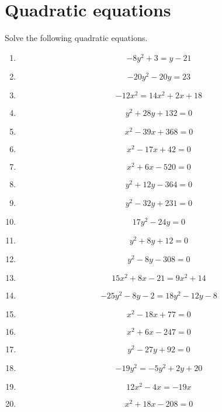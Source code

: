\documentclass{article}
\begin{document}
        \section{Quadratic equations}
        Solve the following quadratic equations.
        \begin{multicols}{1}
        \begin{enumerate}
        \item $$- 8 y^{2} + 3 = y - 21$$
\item $$- 20 y^{2} - 20 y = 23$$
\item $$- 12 x^{2} = 14 x^{2} + 2 x + 18$$
\item $$y^{2} + 28 y + 132 = 0$$
\item $$x^{2} - 39 x + 368 = 0$$
\item $$x^{2} - 17 x + 42 = 0$$
\item $$x^{2} + 6 x - 520 = 0$$
\item $$y^{2} + 12 y - 364 = 0$$
\item $$y^{2} - 32 y + 231 = 0$$
\item $$17 y^{2} - 24 y = 0$$
\item $$y^{2} + 8 y + 12 = 0$$
\item $$y^{2} - 8 y - 308 = 0$$
\item $$15 x^{2} + 8 x - 21 = 9 x^{2} + 14$$
\item $$- 25 y^{2} - 8 y - 2 = 18 y^{2} - 12 y - 8$$
\item $$x^{2} - 18 x + 77 = 0$$
\item $$x^{2} + 6 x - 247 = 0$$
\item $$y^{2} - 27 y + 92 = 0$$
\item $$- 19 y^{2} = - 5 y^{2} + 2 y + 20$$
\item $$12 x^{2} - 4 x = - 19 x$$
\item $$x^{2} + 18 x - 208 = 0$$
        \end{enumerate}
        \end{multicols}
        
\end{document}
